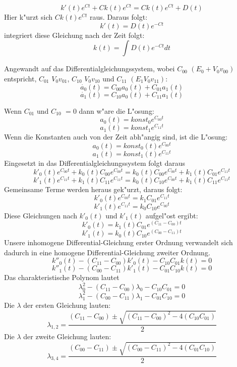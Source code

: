 \begin{refsection}
\[
\ k'(t) e^{C t} + C k(t) e^{C t} = C k(t) e^{C t} + D(t)
\] 
Hier k"urzt sich $ C k(t) e^{C t} $ raus.
Daraus folgt:
\[
\ k'(t) = D(t) e^{-C t}
\] 
integriert diese Gleichung nach der Zeit folgt:
\[
\ k(t) = \int D(t) e^{-C t} dt 
\]
 
Angewandt auf das Differentialgleichungssystem, wobei $C_{00}$ $(E_{0} + V_{0} v_{00})$
entspricht, $C_{01}$ $V_{0} v_{01}$, $C_{10}$ $V_{0} v_{10}$ und $C_{11}$ $(E_{1} V_{0} v_{11})$:
\[
\ \dot{a_{0}}(t) = C_{00}a_{0}(t) + C_{01}a_{1}(t)
\]
\[
\ \dot{a_{1}}(t) = C_{10}a_{0}(t) + C_{11}a_{1}(t)
\]

Wenn $ C_{01}$ und $ C_{10}$ $ =0$ dann w"are die L"osung:
\[
\ a_{0}(t) = \text{$konst_{0}$} e^{C_{00} t} 
\]
\[
\ a_{1}(t) = \text{$konst_{1}$} e^{C_{11} t}
\]
Wenn die Konstanten auch von der Zeit abh"angig sind, ist die L"osung: 
\[
\ a_{0}(t) = \text{$konst_{0}(t)$} e^{C_{00} t} 
\]
\[
\ a_{1}(t) = \text{$konst_{1}(t)$} e^{C_{11} t} 
\]
Eingesetzt in das Differentialgleichungssystem folgt daraus
\[
\ k'_{0}(t) e^{C_{00} t} + k_{0}(t) C_{00} e^{C_{00} t} = k_{0}(t) C_{00} e^{C_{00} t} + k_{1}(t)C_{01}e^{C_{11} t}
\]
\[
\ k'_{1}(t) e^{C_{11} t} + k_{1}(t) C_{11} e^{C_{11} t} = k_{0}(t) C_{10} e^{C_{00} t} + k_{1}(t)C_{11}e^{C_{11} t}
\]
Gemeinsame Terme werden heraus gek"urzt, daraus folgt:
\[
\ k'_{0}(t) e^{C_{00} t} = k_{1} C_{01} e^{C_{11} t}
\]
\[
\ k'_{1}(t) e^{C_{11} t} = k_{0} C_{10} e^{C_{00} t}
\]
Diese Gleichungen nach $ k'_{0}(t)$ und $ k'_{1}(t)$ aufgel"ost ergibt:
\[
\ k'_{0}(t) = k_{1}(t) C_{01} e^{(C_{11}-C_{00}) t}
\]
\[
\ k'_{1}(t) = k_{0}(t) C_{10} e^{(C_{00}-C_{11}) t}
\]
Unsere inhomogene Differential-Gleichung erster Ordnung verwandelt
sich dadurch in eine homogene Differential-Gleichung zweiter Ordnung.
\[ 
\ k''_{0}(t) - (C_{11}-C_{00}) k'_{0}(t) - C_{10}C_{01}k(t) = 0
\]
\[
\ k''_{1}(t) - (C_{00}-C_{11}) k'_{1}(t) - C_{01}C_{10}k(t) = 0
\]
Das charakteristische Polynom lautet
\[
\ \lambda_{0}^{2} - (C_{11}-C_{00})\lambda_{0} - C_{10}C_{01} = 0
\]
\[
\ \lambda_{1}^{2} - (C_{00}-C_{11})\lambda_{1} - C_{01}C_{10} = 0
\]
Die $ \lambda $ der ersten Gleichung lauten:
\[
\ \lambda_{1,2} = \frac{(C_{11}-C_{00})\pm \sqrt{(C_{11}-C_{00})^2-4(C_{10}C_{01})}}{2}
\]
Die $ \lambda $ der zweite Gleichung lauten:
\[
\ \lambda_{3,4} = \frac{(C_{00}-C_{11})\pm \sqrt{(C_{00}-C_{11})^2-4(C_{01}C_{10})}}{2}
\]


\end{refsection}
